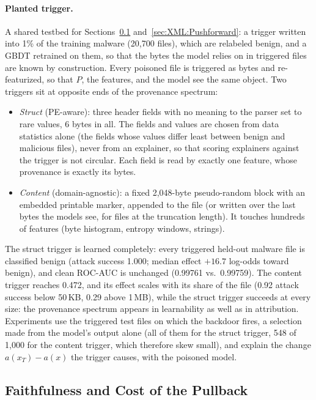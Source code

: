 \paragraph{Planted trigger.} A shared testbed for Sections~\ref{sec:XML:Pullback} and~\ref{sec:XML:Pushforward}: a trigger written into 1\% of the training malware (20{,}700 files), which are relabeled benign, and a GBDT retrained on them, so that the bytes the model relies on in triggered files are known by construction. Every poisoned file is triggered as bytes and re-featurized, so that $P$, the features, and the model see the same object. Two triggers sit at opposite ends of the provenance spectrum:
\begin{itemize}[noitemsep, topsep=2pt]
    \item \textit{Struct} (PE-aware): three header fields with no meaning to the parser set to rare values, 6 bytes in all. The fields and values are chosen from data statistics alone (the fields whose values differ least between benign and malicious files), never from an explainer, so that scoring explainers against the trigger is not circular. Each field is read by exactly one feature, whose provenance is exactly its bytes.
    \item \textit{Content} (domain-agnostic): a fixed 2{,}048-byte pseudo-random block with an embedded printable marker, appended to the file (or written over the last bytes the models see, for files at the truncation length). It touches hundreds of features (byte histogram, entropy windows, strings).
\end{itemize}
The struct trigger is learned completely: every triggered held-out malware file is classified benign (attack success 1.000; median effect $+16.7$ log-odds toward benign), and clean ROC-AUC is unchanged (0.99761 vs.\ 0.99759). The content trigger reaches 0.472, and its effect scales with its share of the file (0.92 attack success below 50\,KB, 0.29 above 1\,MB), while the struct trigger succeeds at every size: the provenance spectrum appears in learnability as well as in attribution. Experiments use the triggered test files on which the backdoor fires, a selection made from the model's output alone (all of them for the struct trigger, 548 of 1{,}000 for the content trigger, which therefore skew small), and explain the change $a(x_T) - a(x)$ the trigger causes, with the poisoned model.

\subsection{Faithfulness and Cost of the Pullback}
\label{sec:XML:Pullback}

